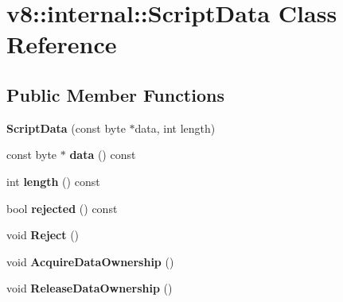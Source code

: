 \hypertarget{classv8_1_1internal_1_1_script_data}{}\section{v8\+:\+:internal\+:\+:Script\+Data Class Reference}
\label{classv8_1_1internal_1_1_script_data}
\subsection*{Public Member Functions}
\begin{DoxyCompactItemize}
\item 
{\bfseries Script\+Data} (const byte $\ast$data, int length)\hypertarget{classv8_1_1internal_1_1_script_data_af29481a7afc246d1f640209814e10158}{}\label{classv8_1_1internal_1_1_script_data_af29481a7afc246d1f640209814e10158}

\item 
const byte $\ast$ {\bfseries data} () const \hypertarget{classv8_1_1internal_1_1_script_data_a2cb6ef124f72db2403511467bf8cd8d9}{}\label{classv8_1_1internal_1_1_script_data_a2cb6ef124f72db2403511467bf8cd8d9}

\item 
int {\bfseries length} () const \hypertarget{classv8_1_1internal_1_1_script_data_a5291d999dfc83c4589c630291c562f49}{}\label{classv8_1_1internal_1_1_script_data_a5291d999dfc83c4589c630291c562f49}

\item 
bool {\bfseries rejected} () const \hypertarget{classv8_1_1internal_1_1_script_data_add3a3f3c2c5fb2f93acab8089c166190}{}\label{classv8_1_1internal_1_1_script_data_add3a3f3c2c5fb2f93acab8089c166190}

\item 
void {\bfseries Reject} ()\hypertarget{classv8_1_1internal_1_1_script_data_a915eb8d558928bdf0016bf4742283679}{}\label{classv8_1_1internal_1_1_script_data_a915eb8d558928bdf0016bf4742283679}

\item 
void {\bfseries Acquire\+Data\+Ownership} ()\hypertarget{classv8_1_1internal_1_1_script_data_a6461a45e69ebeb126945be3a4f28bc8e}{}\label{classv8_1_1internal_1_1_script_data_a6461a45e69ebeb126945be3a4f28bc8e}

\item 
void {\bfseries Release\+Data\+Ownership} ()\hypertarget{classv8_1_1internal_1_1_script_data_adeb796cca677fc9bc0f802db04c78778}{}\label{classv8_1_1internal_1_1_script_data_adeb796cca677fc9bc0f802db04c78778}

\end{DoxyCompactItemize}
